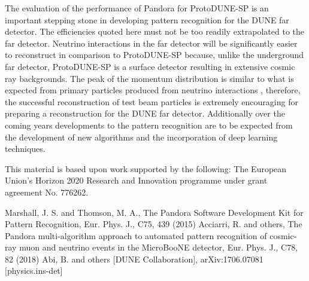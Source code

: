 The evaluation of the performance of Pandora for ProtoDUNE-SP is an important stepping stone in developing pattern recognition for the DUNE far detector.  The efficiencies quoted here must not be too readily extrapolated to the far detector.  Neutrino interactions in the far detector will be significantly easier to reconstruct in comparison to ProtoDUNE-SP because, unlike the underground far detector, ProtoDUNE-SP is a surface detector resulting in extensive cosmic ray backgrounds.  The peak of the momentum distribution is  similar to what is expected from primary particles produced from neutrino interactions , therefore, the successful reconstruction of test beam particles is extremely encouraging for preparing a reconstruction for the DUNE far detector.  Additionally over the coming years developments to the pattern recognition are to be expected from the development of new algorithms and the incorporation of deep learning techniques.  

\begin{acknowledgements}
This material is based upon work supported by the following: The European Union’s Horizon 2020 Research and Innovation programme under grant agreement No. 776262.
\end{acknowledgements}


\begin{thebibliography}{}
%
%
Marshall, J. S. and Thomson, M. A., The Pandora Software Development Kit for Pattern Recognition, Eur. Phys. J., C75, 439 (2015)
Acciarri, R. and others, The Pandora multi-algorithm approach to automated pattern recognition of cosmic-ray muon and neutrino events in the MicroBooNE detector, Eur. Phys. J., C78, 82 (2018)
Abi, B. and others [DUNE Collaboration], arXiv:1706.07081 [physics.ins-det]
\end{thebibliography}



